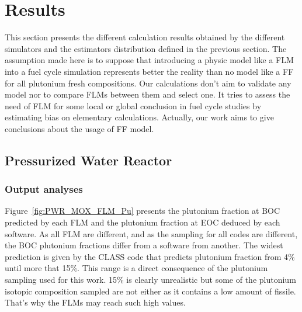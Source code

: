 
\section{Results}

This section presents the different calculation results obtained by the
different simulators and the estimators distribution defined in the previous
section.  The assumption made here is to suppose that introducing a physic model
like a \gls{FLM} into a fuel cycle simulation represents better the reality than
no model like a \gls{FF} for all plutonium fresh compositions. Our calculations
don't aim to validate any model nor to compare \gls{FLM}s between them and
select one. It tries to assess the need of \gls{FLM} for some local or global
conclusion in fuel cycle studies by estimating bias on elementary calculations.
Actually, our work aims to give conclusions about the usage of \gls{FF} model.   

\subsection{Pressurized Water Reactor}
\subsubsection{Output analyses}

Figure~\ref{fig:PWR_MOX_FLM_Pu} presents the plutonium fraction at \gls{BOC} predicted
by each \gls{FLM} and the plutonium fraction at \gls{EOC} deduced by each software. As all
FLM are different, and as the sampling for all codes are different, the \gls{BOC} plutonium fractions differ from a software from
another. The widest prediction is given by the CLASS code that predicts plutonium
fraction from 4\% until more that 15\%. This range is a direct consequence of
the plutonium sampling used for this work. 15\% is clearly unrealistic but some
of the plutonium isotopic composition sampled are not either as it contains a low
amount of fissile. That's why the \gls{FLM}s may reach such high values.    

